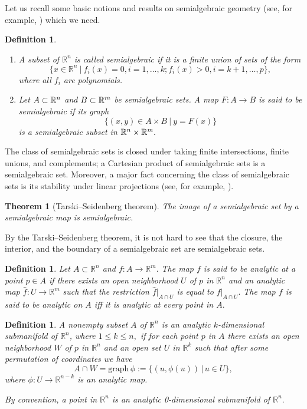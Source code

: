 \documentclass[10pt,reqno]{amsart}
\theoremstyle{break-italic}
\theoremstyle{break-italic}
\theoremstyle{break-italic}
\theoremstyle{break-italic}
\theoremstyle{break-italic}
\theoremstyle{break-italic}
\theoremstyle{break-italic}
\theoremstyle{break-italic}
\newtheorem{theorem}[satz]{Theorem}
\theoremstyle{break-roman}
\newtheorem{definition}[satz]{Definition}
\theoremstyle{standard}
\theoremstyle{varthm-roman}
\theoremstyle{varthm-italic}
\theoremstyle{varthm-roman-break}
\theoremstyle{varthm-italic-break}
\theoremstyle{varthm-roman-no-punctuation}
\theoremstyle{varthm-italic-no-punctuation}
\numberwithin{equation}{section}
\begin{document}
Let us recall some basic notions and results on semialgebraic geometry (see, for example, \cite{Bochnak1998}) which we need.

\begin{definition}{\rm
\begin{enumerate}
  \item[(i)] A subset of $\mathbb{R}^n$ is called {\em semialgebraic} if it is a finite union of sets of the form
$$\{x \in \mathbb{R}^n \ | \ f_i(x) = 0, i = 1, \ldots, k; f_i(x) > 0, i = k + 1, \ldots, p\},$$
where all $f_{i}$ are polynomials.
 \item[(ii)]
Let $A \subset \Bbb{R}^n$ and $B \subset \Bbb{R}^m$ be semialgebraic sets. A map $F \colon A \to B$ is said to be {\em semialgebraic} if its graph
$$\{(x, y) \in A \times B \ | \ y = F(x)\}$$
is a semialgebraic subset in $\Bbb{R}^n\times\Bbb{R}^m.$
\end{enumerate}
}\end{definition}

The class of semialgebraic sets is closed under taking finite intersections, finite unions, and complements; a Cartesian product of semialgebraic sets is a semialgebraic set. Moreover, a major fact concerning the class of semialgebraic sets is its stability under linear projections (see, for example, \cite{Bochnak1998}).

\begin{theorem}[Tarski--Seidenberg theorem] \label{TarskiSeidenbergTheorem}
The image of a semialgebraic set by a semialgebraic map is semialgebraic.
\end{theorem}

By the Tarski--Seidenberg theorem, it is not hard to see that the closure, the interior, and the boundary of a semialgebraic set are semialgebraic sets.

\begin{definition}{\rm
Let $A \subset {\mathbb R}^n$ and $f \colon A \rightarrow {\mathbb R}^m.$ The map $f$ is said to be {\em analytic at a point $p \in A$} if there exists an open neighborhood $U$ of $p$ in ${\mathbb R}^n$ and an analytic map $\hat{f} \colon U \rightarrow {\mathbb R}^m$ such that the restriction $\hat{f}|_{A \cap U}$ is equal to $f|_{A \cap U}.$ The map $f$ is said to be {\em analytic} on $A$ iff it is analytic at every point in $A.$
}\end{definition}

\begin{definition} {\rm
A nonempty subset $A$ of ${\mathbb R}^n$ is an {\em analytic  $k$-dimensional submanifold} of ${\mathbb R}^n$, where $1 \le k \le n,$ if for each point $p$ in $A$ there exists an open neighborhood $W$ of $p$ in ${\mathbb R}^n$ and an open set $U$ in ${\mathbb R}^k$ such that after some permutation of coordinates we have
$$A \cap W = \text{graph}\, \phi := \{(u, \phi(u)) \, | \, u \in U\},$$
where $\phi \colon U \to {\mathbb R}^{n - k}$ is an analytic map.

By convention, a point in ${\mathbb R}^n$ is an analytic 0-dimensional submanifold of ${\mathbb R}^n.$
}\end{definition}
\end{document}
